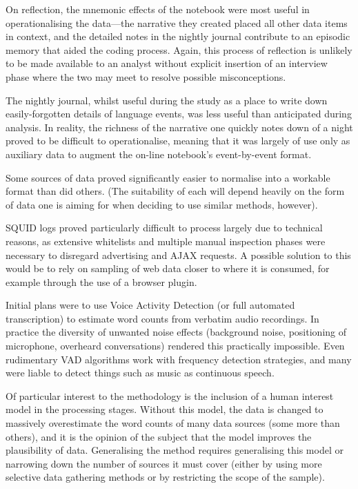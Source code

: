 On reflection, the mnemonic effects of the notebook were most useful in operationalising the data---the narrative they created placed all other data items in context, and the detailed notes in the nightly journal contribute to an episodic memory that aided the coding process.  Again, this process of reflection is unlikely to be made available to an analyst without explicit insertion of an interview phase where the two may meet to resolve possible misconceptions.

The nightly journal, whilst useful during the study as a place to write down easily-forgotten details of language events, was less useful than anticipated during analysis.  In reality, the richness of the narrative one quickly notes down of a night proved to be difficult to operationalise, meaning that it was largely of use only as auxiliary data to augment the on-line notebook's event-by-event format.

Some sources of data proved significantly easier to normalise into a workable format than did others.  (The suitability of each will depend heavily on the form of data one is aiming for when deciding to use similar methods, however).

SQUID logs proved particularly difficult to process largely due to technical reasons, as extensive whitelists and multiple manual inspection phases were necessary to disregard advertising and AJAX requests.  A possible solution to this would be to rely on sampling of web data closer to where it is consumed, for example through the use of a browser plugin.

Initial plans were to use Voice Activity Detection (or full automated transcription) to estimate word counts from verbatim audio recordings.  In practice the diversity of unwanted noise effects (background noise, positioning of microphone, overheard conversations) rendered this practically impossible.  Even rudimentary VAD algorithms work with frequency detection strategies, and many were liable to detect things such as music as continuous speech.  %



Of particular interest to the methodology is the inclusion of a human interest model in the processing stages.  Without this model, the data is changed to massively overestimate the word counts of many data sources (some more than others), and it is the opinion of the subject that the model improves the plausibility of data.  Generalising the method requires generalising this model or narrowing down the number of sources it must cover (either by using more selective data gathering methods or by restricting the scope of the sample).  

